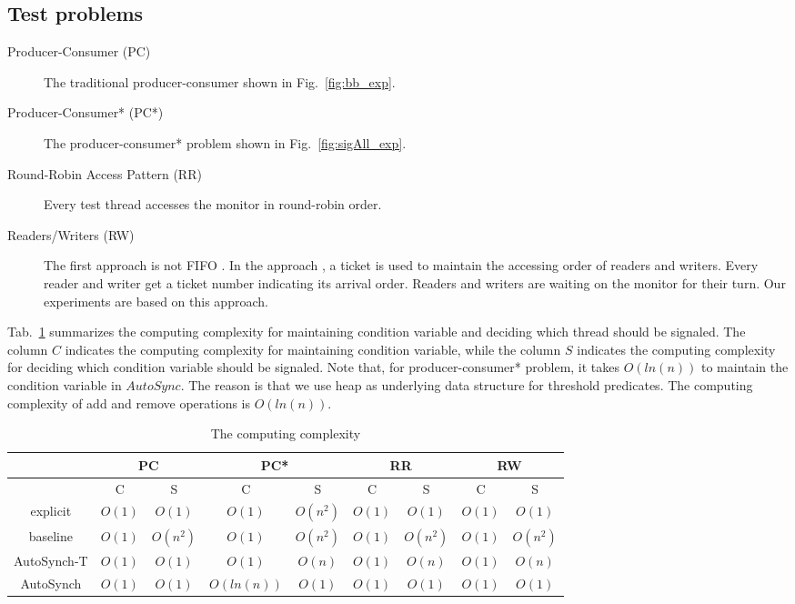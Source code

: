 \documentclass[preprint]{sigplanconf}
\begin{document}
\subsection{Test problems}
\begin{description}
    \item[Producer-Consumer (PC)] The traditional producer-consumer shown in 
        Fig.~\ref{fig:bb_exp}.
    \item[Producer-Consumer* (PC*)] The producer-consumer* problem shown in
        Fig.~\ref{fig:sigAll_exp}. 
    \item[Round-Robin Access Pattern (RR)] Every test thread accesses the
        monitor in round-robin order. 
    \item[Readers/Writers (RW)\cite{chp71}] The first approach is not FIFO
        \cite{bh75b}. In the approach \cite{bh05}, a ticket is used
        to maintain the accessing order of readers and writers. Every reader
        and writer get a ticket number indicating its arrival order. Readers
        and writers are waiting on the monitor for their turn. Our experiments
        are based on this approach. 
\end{description}

Tab.~\ref{tab:complexity} summarizes the computing complexity for maintaining 
condition variable and deciding which thread should be signaled. The column $C$
indicates the computing complexity for maintaining condition variable, while 
the column $S$ indicates the computing complexity for deciding which condition 
variable should be signaled. Note that, for producer-consumer* problem, it
takes $O(ln(n))$ to maintain the condition variable in $AutoSync$. The reason 
is that we use heap as underlying data structure for threshold predicates. The 
computing complexity of add and remove operations is $O(ln(n))$.

\begin{table}[ht!]
   \centering
   \begin{tabular}{|c||c|c||c|c||c|c||c|c|}
      \hline 
      & \multicolumn{2}{c||}{PC} & \multicolumn{2}{c||}{PC*} & 
        \multicolumn{2}{c||}{RR} & \multicolumn{2}{c|}{RW} \\
      \hline
         & C & S & C & S & C & S & C & S \\
      \hline 
      \hline 
      explicit & $O(1)$ & $O(1)$ & $O(1)$ & $O(n^2)$ & $O(1)$ & $O(1)$ & $O(1)$ &
      $O(1)$ \\
      \hline 
      baseline & $O(1)$ & $O(n^2)$ & $O(1)$ & $O(n^2)$ & $O(1)$ & $O(n^2)$ &
      $O(1)$ & $O(n^2)$ \\
      \hline 
      AutoSynch-T & $O(1)$ & $O(1)$ & $O(1)$ & $O(n)$ & $O(1)$ & $O(n)$ & $O(1)$ 
      & $O(n)$ \\
      \hline 
      AutoSynch & $O(1)$ & $O(1)$ & $O(ln(n))$ & $O(1)$ & $O(1)$ & $O(1)$ & 
      $O(1)$ & $O(1)$\\
      \hline 
   \end{tabular}
   \caption{The computing complexity}
   \label{tab:complexity}
\end{table}
\end{document}
